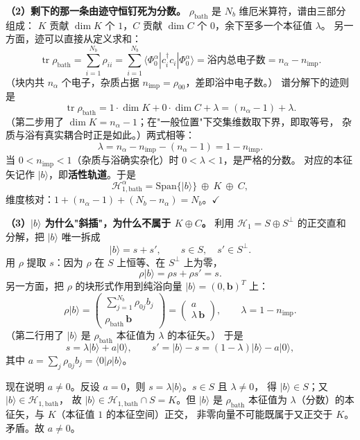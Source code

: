 \documentclass[11pt]{ctexart}
\begin{document}
\textbf{（2）剩下的那一条由迹守恒钉死为分数。}
$\rho_{\mathrm{bath}}$ 是 $N_b$ 维厄米算符，谱由三部分组成：
$K$ 贡献 $\dim K$ 个 $1$，$C$ 贡献 $\dim C$ 个 $0$，余下至多一个本征值 $\lambda$。
另一方面，迹可以直接从定义求和：
\[
\operatorname{tr}\rho_{\mathrm{bath}}
=
\sum_{i=1}^{N_b}\rho_{ii}
=
\sum_{i=1}^{N_b}\langle\Phi_0^{\alpha}|c_i^{\dagger}c_i|\Phi_0^{\alpha}\rangle
=
\text{浴内总电子数}
=
n_\alpha-n_{\mathrm{imp}}.
\]
（块内共 $n_\alpha$ 个电子，杂质占据 $n_{\mathrm{imp}}=\rho_{00}$，差即浴中电子数。）
谱分解下的迹则是
\[
\operatorname{tr}\rho_{\mathrm{bath}}
=
1\cdot\dim K+0\cdot\dim C+\lambda
=
(n_\alpha-1)+\lambda.
\]
（第二步用了 $\dim K=n_\alpha-1$；在"一般位置"下交集维数取下界，即取等号，
杂质与浴有真实耦合时正是如此。）两式相等：
\[
\lambda=n_\alpha-n_{\mathrm{imp}}-(n_\alpha-1)=1-n_{\mathrm{imp}}.
\]
当 $0<n_{\mathrm{imp}}<1$（杂质与浴确实杂化）时 $0<\lambda<1$，是严格的分数。
对应的本征矢记作 $|b\rangle$，即\textbf{活性轨道}。于是
\[
\mathcal{H}_{1,\mathrm{bath}}^{\alpha}
=
\mathrm{Span}\{|b\rangle\}\ \oplus\ K\ \oplus\ C ,
\]
维度核对：$1+(n_\alpha-1)+(N_b-n_\alpha)=N_b$。$\checkmark$

\textbf{（3）$|b\rangle$ 为什么"斜插"，为什么不属于 $K\oplus C$。}
利用 $\mathcal{H}_1=S\oplus S^{\perp}$ 的正交直和分解，把 $|b\rangle$ 唯一拆成
\[
|b\rangle=s+s',\qquad s\in S,\quad s'\in S^{\perp}.
\]
用 $\rho$ 提取 $s$：因为 $\rho$ 在 $S$ 上恒等、在 $S^{\perp}$ 上为零，
\[
\rho|b\rangle=\rho s+\rho s'=s.
\]
另一方面，把 $\rho$ 的块形式作用到纯浴向量 $|b\rangle=(0,\mathbf{b})^T$ 上：
\[
\rho|b\rangle
=
\begin{pmatrix}
\sum_{j=1}^{N_b}\rho_{0j}b_j\\[6pt]
\rho_{\mathrm{bath}}\,\mathbf{b}
\end{pmatrix}
=
\begin{pmatrix}
a\\[2pt]
\lambda\,\mathbf{b}
\end{pmatrix},
\qquad
\lambda=1-n_{\mathrm{imp}}.
\]
（第二行用了 $|b\rangle$ 是 $\rho_{\mathrm{bath}}$ 本征值为 $\lambda$ 的本征矢。）
于是
\[
s=\lambda|b\rangle+a|0\rangle ,
\qquad
s'=|b\rangle-s=(1-\lambda)|b\rangle-a|0\rangle ,
\]
其中 $a=\sum_{j}\rho_{0j}b_j=\langle0|\rho|b\rangle$。

现在说明 $a\neq0$。反设 $a=0$，则 $s=\lambda|b\rangle$。$s\in S$ 且 $\lambda\neq0$，
得 $|b\rangle\in S$；又 $|b\rangle\in\mathcal{H}_{1,\mathrm{bath}}$，
故 $|b\rangle\in\mathcal{H}_{1,\mathrm{bath}}\cap S=K$。但 $|b\rangle$ 是 $\rho_{\mathrm{bath}}$
本征值为 $\lambda$（分数）的本征矢，与 $K$（本征值 $1$ 的本征空间）正交，
非零向量不可能既属于又正交于 $K$。矛盾。故 $a\neq0$。
\end{document}
